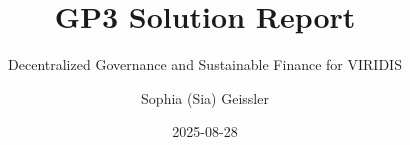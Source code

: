 \documentclass[
  english,
  12pt,
  oneside,
  open=any]{scrbook}
\title{GP3 Solution Report}
\subtitle{Decentralized Governance and Sustainable Finance for VIRIDIS}
\author{Sophia (Sia) Geissler}
\date{2025-08-28}
\begin{document}

  \begin{frontmatter}

\begin{titlepage}


\newcommand{\titlepagepagealign}{
\ifthenelse{\equal{left}{right}}{\raggedleft}{}
\ifthenelse{\equal{left}{center}}{\centering}{}
\ifthenelse{\equal{left}{left}}{\raggedright}{}
}


\newcommand{\titleandsubtitle}{
{{\large{\bfseries{\nohyphens{GP3 Solution Report}}}}\par
}%

\vspace{\betweentitlesubtitle}
{
{\large{\textit{\nohyphens{Decentralized Governance and Sustainable
Finance for VIRIDIS}}}}\par
}}
\newcommand{\titlepagetitleblock}{
\titleandsubtitle
}

\newcommand{\authorstyle}[1]{{\large{#1}}}

\newcommand{\affiliationstyle}[1]{{\large{#1}}}

\newcommand{\titlepageauthorblock}{
{\authorstyle{\nohyphens{Sophia (Sia) Geissler}{\textsuperscript{1}}}}}

\newcommand{\titlepageaffiliationblock}{
\hangindent=1em
\hangafter=1
{\affiliationstyle{
{1}.~Inholland University of Applied Sciences,~Diemen, The Netherlands


\vspace{1\baselineskip} 
}}
}
\newcommand{\headerstyled}{%
{Graduation Project 3 --- Business Innovation}
}
\newcommand{\footerstyled}{%
{\large{Inholland University of Applied Sciences\\
GP3 Solution Report\\
VIRIDIS --- Green Tech Investment AG}}
}
\newcommand{\datestyled}{%
{2025-08-28}
}


\newcommand{\titlepageheaderblock}{\headerstyled}

\newcommand{\titlepagefooterblock}{
\footerstyled
}

\newcommand{\titlepagedateblock}{
\datestyled
}

\newcommand{\titleblock}{\newlength{\betweentitlesubtitle}
\setlength{\betweentitlesubtitle}{\baselineskip}
{

{\titlepagetitleblock}
}

}
\end{titlepage}
\end{frontmatter}
\end{document}
